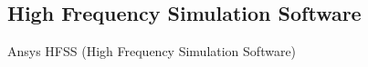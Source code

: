 \subsection{High Frequency Simulation Software}

Ansys HFSS (High Frequency Simulation Software) %




